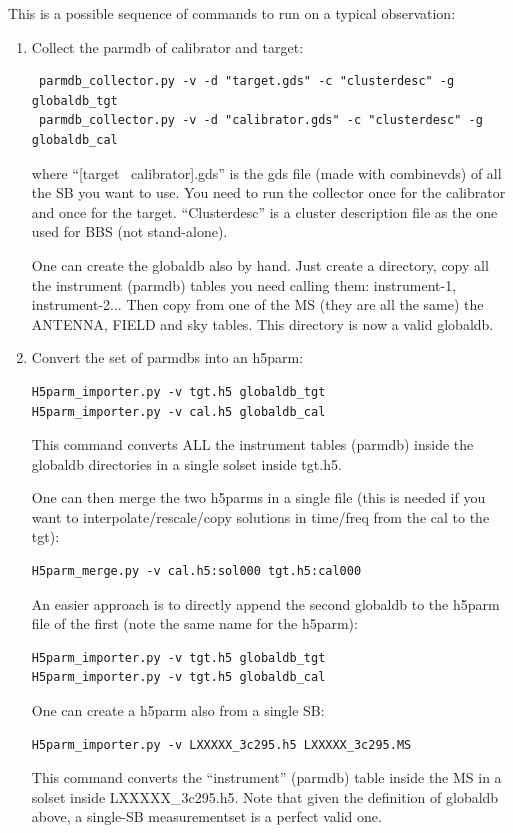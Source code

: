 \documentclass[]{article}
\begin{document}
This is a possible sequence of commands to run \losoto{} on a typical observation:
\begin{enumerate}

\item Collect the parmdb of calibrator and target:
\begin{verbatim}
 parmdb_collector.py -v -d "target.gds" -c "clusterdesc" -g globaldb_tgt
 parmdb_collector.py -v -d "calibrator.gds" -c "clusterdesc" -g globaldb_cal
\end{verbatim}
where ``[target \textbar\ calibrator].gds'' is the gds file (made with combinevds) of all the SB you want to use. You need to run the collector once for the calibrator and once for the target. ``Clusterdesc'' is a cluster description file as the one used for BBS (not stand-alone).

One can create the globaldb also by hand. Just create a directory, copy all the instrument (parmdb) tables you need calling them: instrument-1, instrument-2... Then copy from one of the MS (they are all the same) the ANTENNA, FIELD and sky tables. This directory is now a valid globaldb.

\item Convert the set of parmdbs into an h5parm:
\begin{verbatim}
H5parm_importer.py -v tgt.h5 globaldb_tgt
H5parm_importer.py -v cal.h5 globaldb_cal
\end{verbatim}
This command converts ALL the instrument tables (parmdb) inside the globaldb directories in a single solset inside tgt.h5.

One can then merge the two h5parms in a single file (this is needed if you want to interpolate/rescale/copy solutions in time/freq from the cal to the tgt):
\begin{verbatim}
H5parm_merge.py -v cal.h5:sol000 tgt.h5:cal000
\end{verbatim}

An easier approach is to directly append the second globaldb to the h5parm file of the first (note the same name for the h5parm):
\begin{verbatim}
H5parm_importer.py -v tgt.h5 globaldb_tgt
H5parm_importer.py -v tgt.h5 globaldb_cal
\end{verbatim}

One can create a h5parm also from a single SB:
\begin{verbatim}
H5parm_importer.py -v LXXXXX_3c295.h5 LXXXXX_3c295.MS
\end{verbatim}
This command converts the ``instrument'' (parmdb) table inside the MS in a solset inside LXXXXX\_3c295.h5. Note that given the definition of globaldb above, a single-SB measurementset is a perfect valid one.


\end{enumerate}
\end{document}
